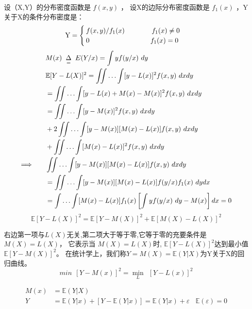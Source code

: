 设（X,Y）的分布密度函数是 $  f(x,y) $ ， 设X的边际分布密度函数是 $  f_{1}(x) $ ，Y关于X的条件分布密度是：
\[ \rm Y = \begin{cases}
				f(x,y)/f_{1} (x)  \qquad \qquad f_{1} (x) \neq 0 \\
				0        \qquad  \quad  \qquad     \qquad \qquad f_{1} (x)= 0 
			\end{cases}  \]
	\begin{align*}
		& M(x) \underset{ \ \ = \ \ }{\Delta} E(Y / x)=\int y f(y / x) ~ d y\\
		&\mathbb{E}[Y-L(X)]^{2}=\iint \ldots \int[y-L(x)]^{2} f(x, y) ~ d x d y \\ 
		& 	= \iint \ldots \int[y-L(x)+M(x)-M(x)]^{2} f(x, y) ~ d x d y \\
		&	= \iint \ldots \int[y-M(x)]^{2} f(x, y) ~ d x d y\\
		&+2 \iint \ldots \int[y-M(x)][M(x)-L(x)] f(x, y) ~ d x d y\\
		&+\iint \ldots \int[M(x)-L(x)]^{2} f(x, y) ~ d x d y  \vspace{1em} \\
		\Longrightarrow \qquad
		& \iint \ldots \int[y-M(x)][M(x)-L(x)] f(x, y) ~ d x d y \\
		& =\iint \ldots \int[y-M(x)][M(x)-L(x)] f(y / x) f_{1}(x) ~ d y d x \\
		& =\int \ldots \int[M(x)-L(x)] f_{1}(x)\left[\int y f(y / x) ~  d y-M(x)\right] d x = 0
	\end{align*}
\begin{equation}
	\mathbb{E}[Y-L(X)]^{2} = \mathbb{E}[Y-M(X)]^{2} + \mathbb{E}[M(X)-L(X)]^{2}
\end{equation}

右边第一项与$ L(X) $无关,第二项大于等于零,它等于零的充要条件是$ M(X) = L(X) $， 
它表示当 $ M(X) = L(X) $时, $ \mathbb{E}[Y-L(X)]^{2} $达到最小值 $ \mathbb{E}[Y-M(X)]^{2} $。
在统计学上，我们称$ Y = M(X) = \mathbb{E}(Y|X)  $为Y关于X的回归曲线。
\begin{displaymath}
	min \ \  [Y - M(x)]^2 = \min_{L} \ \ [Y-L(x)]^2 
\end{displaymath}
\begin{theorem}[条件均值]
	\begin{align*}
		M(x) & = \mathbb{E}(Y|X)	\\
		Y & = \mathbb{E}(Y|x) + [ Y-\mathbb{E}(Y|x) ] = \mathbb{E}(Y|x) + \varepsilon \ \ \ \ \mathbb{E}(\varepsilon) =  0 
	\end{align*}
\end{theorem}

